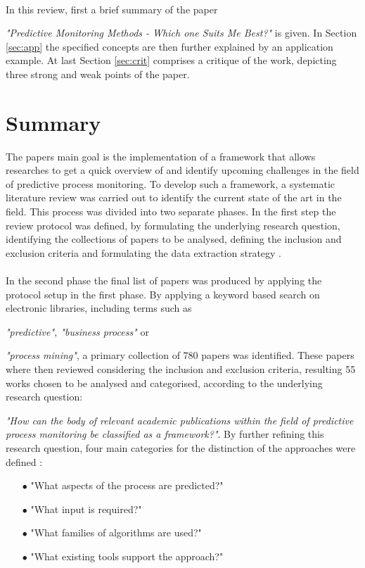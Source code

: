 \documentclass{llncs}
\begin{document}
\paragraph{}
In this review, first a brief summary of the paper {\textit{"Predictive Monitoring Methods - Which one Suits Me Best?"} is given. 
In Section \ref{sec:app} the specified concepts are then further explained by an application example. At last Section \ref{sec:crit} comprises 
a critique of the work, depicting three strong and weak points of the paper.


\section{Summary}\label{sec:sum}
The papers main goal is the implementation of a framework that allows researches to get a quick overview of and identify upcoming challenges 
in the field of predictive process monitoring. To develop such a framework, a systematic literature review was carried out to identify 
the current state of the art in the field. This process was divided into two separate phases. In the first step the review protocol was defined, 
by formulating the underlying research question, identifying the collections of papers to be analysed, defining the inclusion and exclusion criteria and 
formulating the data extraction strategy \cite{di2018predictive}.
\paragraph{}
In the second phase the final list of papers was produced by applying the protocol setup in the first phase.
By applying a keyword based search on electronic libraries, including terms such as {\textit{"predictive", "business process"} or {\textit{"process mining"}, a primary collection of 780 papers was identified.
These papers where then reviewed considering  the inclusion and exclusion criteria, resulting 55 works chosen to be analysed and categorised, according to the underlying 
research question: {\textit{"How can the body of relevant academic publications within the field of predictive process monitoring be classified as a framework?"}.
By further refining this research question, four main categories for the distinction of the approaches were defined \cite{di2018predictive}:
\begin{itemize}
    \item[$\bullet$] "What aspects of the process are predicted?"
    \item[$\bullet$] "What input is required?"
    \item[$\bullet$] "What families of algorithms are used?"
    \item[$\bullet$] "What existing tools support the approach?"
\end{itemize}

}}}}
\end{document}
